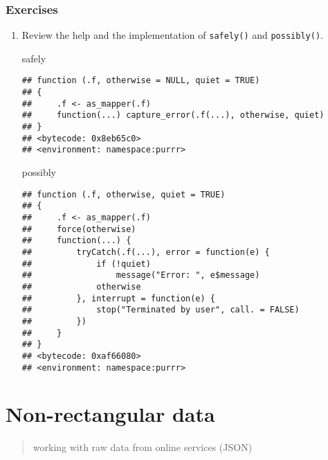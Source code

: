 \documentclass[]{book}
\newenvironment{Shaded}{\begin{snugshade}}{\end{snugshade}}
\newcommand{\NormalTok}[1]{#1}
\begin{document}
\hypertarget{exercises-19}{%
\subsection{Exercises}\label{exercises-19}}

\begin{enumerate}
\def\labelenumi{\arabic{enumi}.}
\item
  Review the help and the implementation of \texttt{safely()} and \texttt{possibly()}.

\begin{Shaded}
\begin{Highlighting}[]
\NormalTok{safely}
\end{Highlighting}
\end{Shaded}

\begin{verbatim}
## function (.f, otherwise = NULL, quiet = TRUE) 
## {
##     .f <- as_mapper(.f)
##     function(...) capture_error(.f(...), otherwise, quiet)
## }
## <bytecode: 0x8eb65c0>
## <environment: namespace:purrr>
\end{verbatim}

\begin{Shaded}
\begin{Highlighting}[]
\NormalTok{possibly}
\end{Highlighting}
\end{Shaded}

\begin{verbatim}
## function (.f, otherwise, quiet = TRUE) 
## {
##     .f <- as_mapper(.f)
##     force(otherwise)
##     function(...) {
##         tryCatch(.f(...), error = function(e) {
##             if (!quiet) 
##                 message("Error: ", e$message)
##             otherwise
##         }, interrupt = function(e) {
##             stop("Terminated by user", call. = FALSE)
##         })
##     }
## }
## <bytecode: 0xaf66080>
## <environment: namespace:purrr>
\end{verbatim}
\end{enumerate}

\hypertarget{non-rectangular-data}{%
\chapter{Non-rectangular data}\label{non-rectangular-data}}

\begin{quote}
working with raw data from online services (JSON)
\end{quote}
\end{document}
